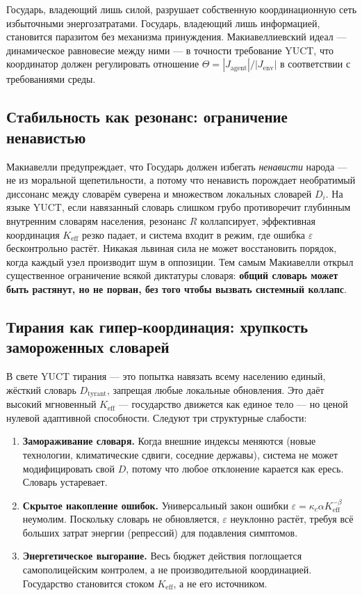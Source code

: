 \documentclass[12pt,a4paper]{article}
\begin{document}
	Государь, владеющий лишь силой, разрушает собственную координационную сеть избыточными энергозатратами. Государь, владеющий лишь информацией, становится паразитом без механизма принуждения. Макиавеллиевский идеал — динамическое равновесие между ними — в точности требование YUCT, что координатор должен регулировать отношение \(\Theta = |J_{\mathrm{agent}}|/|J_{\mathrm{env}}|\) в соответствии с требованиями среды.
	
	\subsection{Стабильность как резонанс: ограничение ненавистью}
	
	Макиавелли предупреждает, что Государь должен избегать \emph{ненависти} народа — не из моральной щепетильности, а потому что ненависть порождает необратимый диссонанс между словарём суверена и множеством локальных словарей \(D_i\). На языке YUCT, если навязанный словарь слишком грубо противоречит глубинным внутренним словарям населения, резонанс \(R\) коллапсирует, эффективная координация \(K_{\mathrm{eff}}\) резко падает, и система входит в режим, где ошибка \(\varepsilon\) бесконтрольно растёт. Никакая львиная сила не может восстановить порядок, когда каждый узел производит шум в оппозиции. Тем самым Макиавелли открыл существенное ограничение всякой диктатуры словаря: \textbf{общий словарь может быть растянут, но не порван, без того чтобы вызвать системный коллапс}.
	
	\subsection{Тирания как гипер‑координация: хрупкость замороженных словарей}
	
	В свете YUCT тирания — это попытка навязать всему населению единый, жёсткий словарь \(D_{\text{tyrant}}\), запрещая любые локальные обновления. Это даёт высокий мгновенный \(K_{\mathrm{eff}}\) — государство движется как единое тело — но ценой нулевой адаптивной способности. Следуют три структурные слабости:
	
	\begin{enumerate}[leftmargin=*]
		\item \textbf{Замораживание словаря.} Когда внешние индексы меняются (новые технологии, климатические сдвиги, соседние державы), система не может модифицировать свой \(D\), потому что любое отклонение карается как ересь. Словарь устаревает.
		\item \textbf{Скрытое накопление ошибок.} Универсальный закон ошибки \(\varepsilon = \kappa_c \alpha K_{\mathrm{eff}}^{-\beta}\) неумолим. Поскольку словарь не обновляется, \(\varepsilon\) неуклонно растёт, требуя всё больших затрат энергии (репрессий) для подавления симптомов.
		\item \textbf{Энергетическое выгорание.} Весь бюджет действия поглощается самополицейским контролем, а не производительной координацией. Государство становится стоком \(K_{\mathrm{eff}}\), а не его источником.
	\end{enumerate}
	
\end{document}
